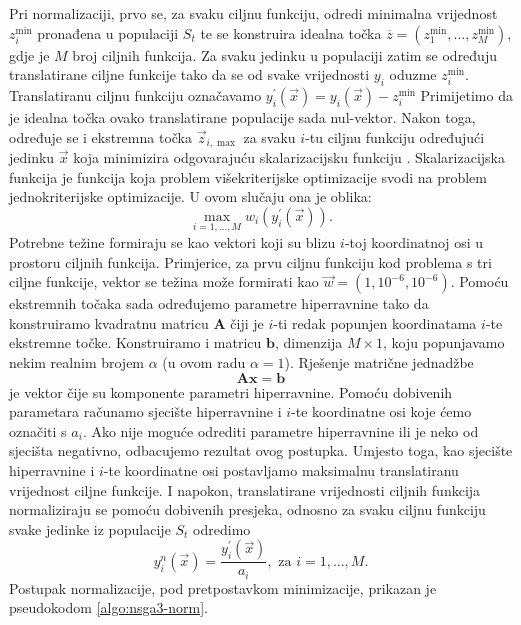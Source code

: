 \documentclass[times, utf8, zavrsni, numeric]{fer}
\begin{document}
Pri normalizaciji, prvo se, za svaku ciljnu funkciju, odredi minimalna vrijednost $z_i^{\min}$ pronađena u populaciji $S_t$ te se konstruira idealna točka $\overline{z} = (z_1^{\min},\dots,z_M^{\min})$, gdje je $M$ broj ciljnih funkcija. Za svaku jedinku u populaciji zatim se određuju translatirane ciljne funkcije tako da se od svake vrijednosti $y_i$ oduzme $z_i^{\min}$. Translatiranu ciljnu funkciju označavamo $y_i^{'}(\vec{x}) = y_i(\vec{x}) - z_i^{\min}$ Primijetimo da je idealna točka ovako translatirane populacije sada nul-vektor. Nakon toga, određuje se i ekstremna točka $\vec{z}_{i,\max}$ za svaku $i$-tu ciljnu funkciju određujući jedinku $\vec{x}$ koja minimizira odgovarajuću skalarizacijsku funkciju . Skalarizacijska funkcija je funkcija koja problem višekriterijske optimizacije svodi na problem jednokriterijske optimizacije. U ovom slučaju ona je oblika:
\begin{equation*}
\underset{i=1,\dots,M}{\max}w_i(y_i^{'}(\vec{x})).
\end{equation*}  
Potrebne težine formiraju se kao vektori koji su blizu $i$-toj koordinatnoj osi u prostoru ciljnih funkcija. Primjerice, za prvu ciljnu funkciju kod problema s tri ciljne funkcije, vektor se težina može formirati kao $\vec{w} = (1, 10^{-6}, 10^{-6})$. Pomoću ekstremnih točaka sada određujemo parametre hiperravnine tako da konstruiramo kvadratnu matricu $\mathbf{A}$ čiji je $i$-ti redak popunjen koordinatama $i$-te ekstremne točke. Konstruiramo i matricu $\mathbf{b}$, dimenzija $M \times 1$, koju popunjavamo nekim realnim brojem $\alpha$ (u ovom radu $\alpha = 1$). Rješenje matrične jednadžbe
\begin{equation*}
\mathbf{A}\mathbf{x} = \mathbf{b}
\end{equation*}
je vektor čije su komponente parametri hiperravnine. Pomoću dobivenih parametara računamo sjecište hiperravnine i $i$-te koordinatne osi koje ćemo označiti s $a_i$. Ako nije moguće odrediti parametre hiperravnine ili je neko od sjecišta negativno, odbacujemo rezultat ovog postupka. Umjesto toga, kao sjecište hiperravnine i $i$-te koordinatne osi postavljamo maksimalnu translatiranu vrijednost ciljne funkcije. I napokon, translatirane vrijednosti ciljnih funkcija normaliziraju se pomoću dobivenih presjeka, odnosno za svaku ciljnu funkciju svake jedinke iz populacije $S_t$ odredimo
\begin{equation*}
y_i^n(\vec{x}) = \frac{y_i^{'}(\vec{x})}{a_i}, \mbox{ za } i = 1,\dots, M.
\end{equation*}  
Postupak normalizacije, pod pretpostavkom minimizacije, prikazan je pseudokodom \ref{algo:nsga3-norm}.\\
\end{document}
